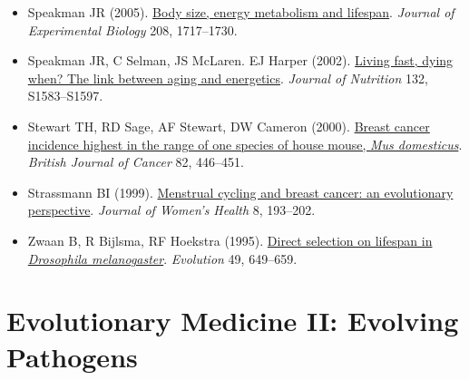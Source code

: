 \documentclass[
]{book}
\begin{document}
\begin{itemize}
\item
  Speakman JR (2005). \href{https://journals.biologists.com/jeb/article/208/9/1717/9377/Body-size-energy-metabolism-and-lifespan}{Body size, energy metabolism and lifespan}. \emph{Journal of Experimental Biology} 208, 1717--1730.
\item
  Speakman JR, C Selman, JS McLaren. EJ Harper (2002). \href{https://academic.oup.com/jn/article/132/6/1583S/4687881}{Living fast, dying when? The link between aging and energetics}. \emph{Journal of Nutrition} 132, S1583--S1597.
\item
  Stewart TH, RD Sage, AF Stewart, DW Cameron (2000). \href{https://www.nature.com/articles/6690941}{Breast cancer incidence highest in the range of one species of house mouse, \emph{Mus domesticus}}. \emph{British Journal of Cancer} 82, 446--451.
\item
  Strassmann BI (1999). \href{https://www.liebertpub.com/doi/10.1089/jwh.1999.8.193}{Menstrual cycling and breast cancer: an evolutionary perspective}. \emph{Journal of Women's Health} 8, 193--202.
\item
  Zwaan B, R Bijlsma, RF Hoekstra (1995). \href{https://onlinelibrary.wiley.com/doi/abs/10.1111/j.1558-5646.1995.tb02301.x}{Direct selection on lifespan in \emph{Drosophila melanogaster}}. \emph{Evolution} 49, 649--659.
\end{itemize}

\hypertarget{evolutionary-medicine-ii-evolving-pathogens}{%
\chapter{Evolutionary Medicine II: Evolving Pathogens}\label{evolutionary-medicine-ii-evolving-pathogens}}
\end{document}

